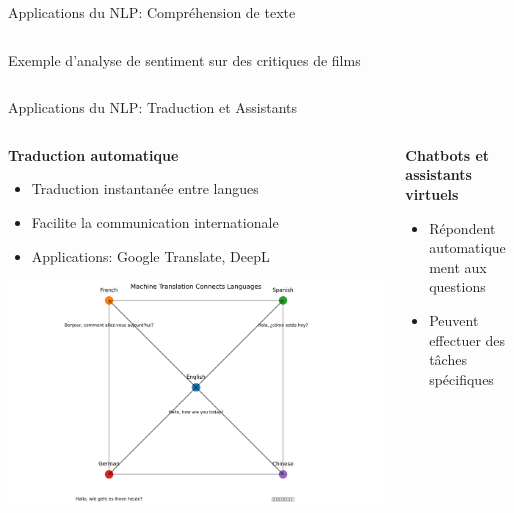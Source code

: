 \documentclass[aspectratio=169,11pt]{beamer}
\begin{document}
\begin{frame}{Applications du NLP: Compréhension de texte}
\begin{columns}
\begin{column}{0.45\textwidth}
            \vspace{0.5cm}
            \begin{center}
                \small{Exemple d'analyse de sentiment sur des critiques de films}
            \end{center}
        \end{column}
    \end{columns}
\end{frame}

\begin{frame}{Applications du NLP: Traduction et Assistants}
    \begin{columns}
        \begin{column}{0.5\textwidth}
            \textbf{Traduction automatique}
            \begin{itemize}
                \item Traduction instantanée entre langues
                \item Facilite la communication internationale
                \item Applications: Google Translate, DeepL
            \end{itemize}
            \vspace{0.3cm}
            \includegraphics[width=\textwidth]{images/generated/translation.png}
        \end{column}
        \begin{column}{0.5\textwidth}
            \textbf{Chatbots et assistants virtuels}
            \begin{itemize}
                \item Répondent automatiquement aux questions
                \item Peuvent effectuer des tâches spécifiques

\end{itemize}
\end{column}
\end{columns}
\end{frame}
\end{document}
